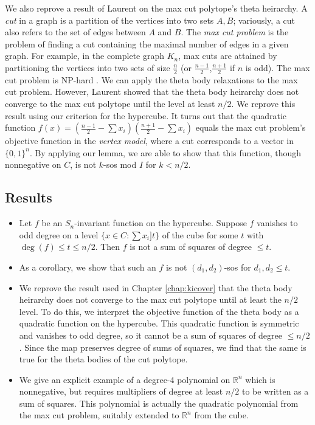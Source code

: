 We also reprove a result of Laurent on the max cut polytope's theta heirarchy.
A {\em cut} in a graph is a partition of the vertices into two sets $A,B$; variously, a cut also refers to the set of edges between $A$ and $B$.
The {\em max cut problem} is the problem of finding a cut containing the maximal number of edges in a given graph.
For example, in the complete graph $K_n$, max cuts are attained by partitioning the vertices into two sets of size $\frac{n}{2}$ (or $\frac{n-1}{2}$,$\frac{n+1}{2}$ if $n$ is odd).
The max cut problem is NP-hard \cite{who}.
We can apply the theta body relaxations to the max cut problem.
However, Laurent \cite{laurent} showed that the theta body heirarchy does not converge to the max cut polytope until the level at least $n/2$.
We reprove this result using our criterion for the hypercube.
It turns out that the quadratic function $f(x) = (\frac{n-1}{2} - \sum x_i)(\frac{n+1}{2} - \sum x_i)$ equals the max cut problem's objective function in the {\em vertex model}, where a cut corresponds to a vector in $\{0,1\}^n$.
By applying our lemma, we are able to show that this function, though nonnegative on $C$, is not $k$-sos mod $I$ for $k < n/2$.

\subsection{Results}
\begin{itemize}
\item Let $f$ be an $S_n$-invariant function on the hypercube.
Suppose $f$ vanishes to odd degree on a level $\{x \in C: \sum x_i ] t\}$ of the cube for some $t$ with $\deg (f) \le t \le n/2$. 
Then $f$ is not a sum of squares of degree $\le t$.
\item As a corollary, we show that such an $f$ is not $(d_1,d_2)$-sos for $d_1,d_2 \le t$.
\item We reprove the result used in Chapter \ref{chap:kicover} that the theta body heirarchy does not converge to the max cut polytope until at least the $n/2$ level.
To do this, we interpret the objective function of the theta body as a quadratic function on the hypercube.
This quadratic function is symmetric and vanishes to odd degree, so it cannot be a sum of squares of degree $\le n/2$.
Since the map preserves degree of sums of squares, we find that the same is true for the theta bodies of the cut polytope.
\item We give an explicit example of a degree-4 polynomial on $\mathbb{R}^n$ which is nonnegative, but requires multipliers of degree at least $n/2$ to be written as a sum of squares.
This polynomial is actually the quadratic polynomial from the max cut problem, suitably extended to $\mathbb{R}^n$ from the cube.
\end{itemize}

